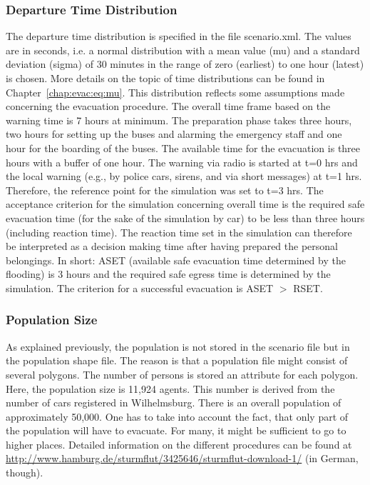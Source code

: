 \subsubsection{Departure Time Distribution}
The departure time distribution is specified in the file scenario.xml. The values are in seconds, i.e. a normal distribution with a mean value (mu) and a standard deviation (sigma) of 30 minutes in the range of zero (earliest) to one hour (latest) is chosen. 
More details on the topic of time distributions can be found in Chapter~\ref{chap:evac:eq:mu}. This distribution reflects some assumptions made concerning the evacuation procedure. The overall time frame based on the warning time is 7 hours at minimum. The preparation phase takes three hours, two hours for setting up the buses and alarming the emergency staff and one hour for the boarding of the buses. The available time for the evacuation is three hours with a buffer of one hour. 
The warning via radio is started at t=0 hrs and the local warning (e.g., by police cars, sirens, and via short messages) at t=1 hrs. Therefore, the reference point for the simulation was set to t=3 hrs. The acceptance criterion for the simulation concerning overall time is the required safe evacuation time (for the sake of the simulation by car) to be less than three hours (including reaction time). The reaction time set in the simulation can therefore be interpreted as a decision making time after having prepared the personal belongings. In short: ASET (available safe evacuation time determined by the flooding) is 3 hours and the required safe egress time is determined by the simulation. The criterion for a successful evacuation is ASET $>$ RSET.

\subsubsection{Population Size}
As explained previously, the population is not stored in the scenario file but in the population shape file. The reason is that a population file might consist of several polygons.  The number of persons is stored an attribute for each polygon. Here, the population size is 11,924 agents. This number is derived from the number of cars registered in Wilhelmsburg. There is an overall population of approximately 50,000. One has to take into account the fact, that only part of the population will have to evacuate. For many, it might be sufficient to go to higher places. Detailed information on the different procedures can be found at \url{http://www.hamburg.de/sturmflut/3425646/sturmflut-download-1/} (in German, though).

